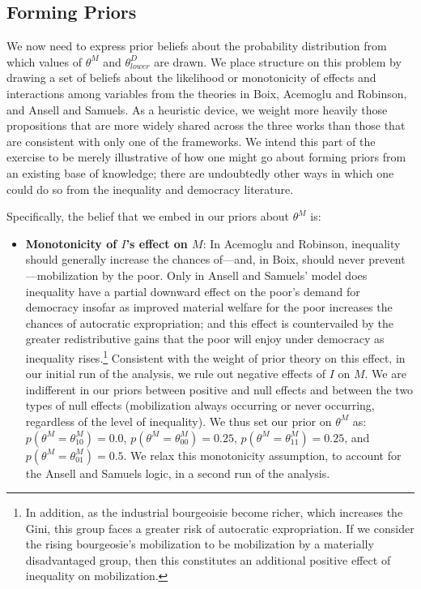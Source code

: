 \documentclass[
  12pt,
]{book}
\providecommand{\tightlist}{%
  \setlength{\itemsep}{0pt}\setlength{\parskip}{0pt}}
\begin{document}
\hypertarget{forming-priors}{%
\subsection{Forming Priors}\label{forming-priors}}

We now need to express prior beliefs about the probability distribution from which values of \(\theta^M\) and \(\theta^D_{lower}\) are drawn. We place structure on this problem by drawing a set of beliefs about the likelihood or monotonicity of effects and interactions among variables from the theories in Boix, Acemoglu and Robinson, and Ansell and Samuels. As a heuristic device, we weight more heavily those propositions that are more widely shared across the three works than those that are consistent with only one of the frameworks. We intend this part of the exercise to be merely illustrative of how one might go about forming priors from an existing base of knowledge; there are undoubtedly other ways in which one could do so from the inequality and democracy literature.

Specifically, the belief that we embed in our priors about \(\theta^M\) is:

\begin{itemize}
\tightlist
\item
  \textbf{Monotonicity of \(I\)'s effect on \(M\)}: In Acemoglu and Robinson, inequality should generally increase the chances of---and, in Boix, should never prevent---mobilization by the poor. Only in Ansell and Samuels' model does inequality have a partial downward effect on the poor's demand for democracy insofar as improved material welfare for the poor increases the chances of autocratic expropriation; and this effect is countervailed by the greater redistributive gains that the poor will enjoy under democracy as inequality rises.\footnote{In addition, as the industrial bourgeoisie become richer, which increases the Gini, this group faces a greater risk of autocratic expropriation. If we consider the rising bourgeosie's mobilization to be mobilization by a materially disadvantaged group, then this constitutes an additional positive effect of inequality on mobilization.} Consistent with the weight of prior theory on this effect, in our initial run of the analysis, we rule out negative effects of \(I\) on \(M\). We are indifferent in our priors between positive and null effects and between the two types of null effects (mobilization always occurring or never occurring, regardless of the level of inequality). We thus set our prior on \(\theta^M\) as: \(p(\theta^M=\theta^M_{10})=0.0\), \(p(\theta^M=\theta^M_{00})=0.25\), \(p(\theta^M=\theta^M_{11})=0.25\), and \(p(\theta^M=\theta^M_{01})=0.5\). We relax this monotonicity assumption, to account for the Ansell and Samuels logic, in a second run of the analysis.
\end{itemize}
\end{document}
